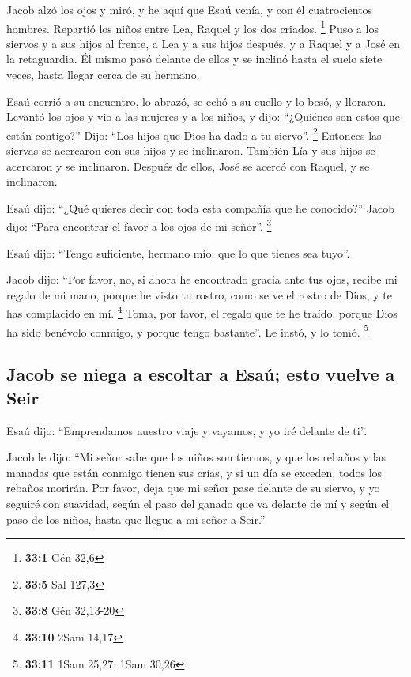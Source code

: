 \begin{paracol}{2}
 Jacob alzó los ojos y miró, y he aquí que Esaú venía, y
con él cuatrocientos hombres. Repartió los niños entre Lea, Raquel y los
dos criados. \footnote{\textbf{33:1} Gén 32,6}  Puso a los
siervos y a sus hijos al frente, a Lea y a sus hijos después, y a Raquel
y a José en la retaguardia.  Él mismo pasó delante de
ellos y se inclinó hasta el suelo siete veces, hasta llegar cerca de su
hermano.

 Esaú corrió a su encuentro, lo abrazó, se echó a su
cuello y lo besó, y lloraron.  Levantó los ojos y vio a
las mujeres y a los niños, y dijo: ``¿Quiénes son estos que están
contigo?'' Dijo: ``Los hijos que Dios ha dado a tu siervo''. \footnote{\textbf{33:5}
  Sal 127,3}  Entonces las siervas se acercaron con sus
hijos y se inclinaron.  También Lía y sus hijos se
acercaron y se inclinaron. Después de ellos, José se acercó con Raquel,
y se inclinaron.

 Esaú dijo: ``¿Qué quieres decir con toda esta compañía
que he conocido?'' Jacob dijo: ``Para encontrar el favor a los ojos de
mi señor''. \footnote{\textbf{33:8} Gén 32,13-20}

 Esaú dijo: ``Tengo suficiente, hermano mío; que lo que
tienes sea tuyo''.

 Jacob dijo: ``Por favor, no, si ahora he encontrado
gracia ante tus ojos, recibe mi regalo de mi mano, porque he visto tu
rostro, como se ve el rostro de Dios, y te has complacido en mí.
\footnote{\textbf{33:10} 2Sam 14,17}  Toma, por favor, el
regalo que te he traído, porque Dios ha sido benévolo conmigo, y porque
tengo bastante''. Le instó, y lo tomó. \footnote{\textbf{33:11} 1Sam
  25,27; 1Sam 30,26}

\hypertarget{jacob-se-niega-a-escoltar-a-esauxfa-esto-vuelve-a-seir}{%
\subsection{Jacob se niega a escoltar a Esaú; esto vuelve a
Seir}\label{jacob-se-niega-a-escoltar-a-esauxfa-esto-vuelve-a-seir}}

 Esaú dijo: ``Emprendamos nuestro viaje y vayamos, y yo
iré delante de ti''.

 Jacob le dijo: ``Mi señor sabe que los niños son
tiernos, y que los rebaños y las manadas que están conmigo tienen sus
crías, y si un día se exceden, todos los rebaños morirán.
 Por favor, deja que mi señor pase delante de su siervo,
y yo seguiré con suavidad, según el paso del ganado que va delante de mí
y según el paso de los niños, hasta que llegue a mi señor a Seir.''


\end{paracol}
